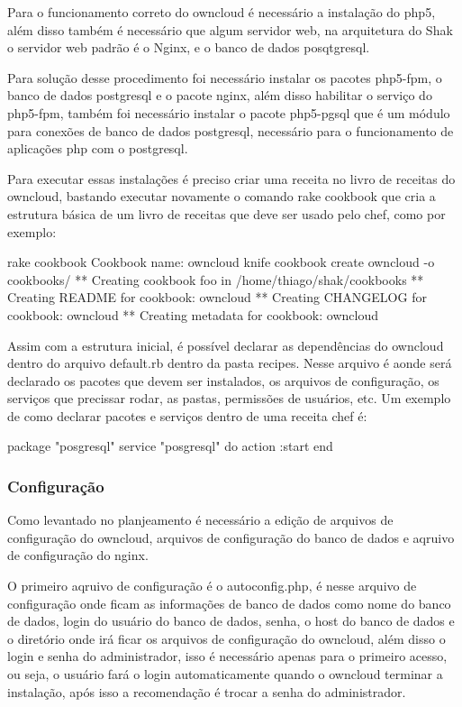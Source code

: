 Para o funcionamento correto do owncloud é necessário a instalação do php5, além
disso também é necessário que algum servidor web, na arquitetura do Shak o servidor
web padrão é o Nginx, e o banco de dados posqtgresql.

Para solução desse procedimento foi necessário instalar os pacotes php5-fpm, o banco
de dados postgresql e o pacote nginx, além disso habilitar o serviço do php5-fpm,
também foi necessário instalar o pacote php5-pgsql que é um módulo para
conexões de banco de dados postgresql, necessário para o funcionamento de
aplicações php com o postgresql.

Para executar essas instalações é preciso criar uma receita no livro de receitas
do owncloud, bastando executar novamente o comando rake cookbook que cria a estrutura básica
de um livro de receitas que deve ser usado pelo chef, como por exemplo:

\begin{center}
  rake cookbook
  Cookbook name: owncloud
  knife cookbook create owncloud -o cookbooks/
  ** Creating cookbook foo in /home/thiago/shak/cookbooks
  ** Creating README for cookbook: owncloud
  ** Creating CHANGELOG for cookbook: owncloud
  ** Creating metadata for cookbook: owncloud
\end{center}

Assim com a estrutura inicial, é possível declarar as dependências do owncloud
dentro do arquivo default.rb dentro da pasta recipes. Nesse arquivo é aonde
será declarado os pacotes que devem ser instalados, os arquivos de configuração,
os serviços que precissar rodar, as pastas, permissões de usuários, etc. Um exemplo
de como declarar pacotes e serviços dentro de uma receita chef é:

\begin{center}
package "posgresql"
service "posgresql" do
  action :start
end
\end{center}

\subsubsection{Configuração}

Como levantado no planjeamento é necessário a edição de arquivos de configuração
do owncloud, arquivos de configuração do banco de dados e aqruivo de configuração
do nginx.

O primeiro aqruivo de configuração é o autoconfig.php, é nesse arquivo de
configuração onde ficam as informações de banco de dados como nome do banco de dados,
login do usuário do banco de dados, senha, o host do banco de dados e o diretório
onde irá ficar os arquivos de configuração do owncloud, além disso o login e senha
do administrador, isso é necessário apenas para o primeiro acesso, ou seja, o usuário
fará o login automaticamente quando o owncloud terminar a instalação, após isso
a recomendação é trocar a senha do administrador.

